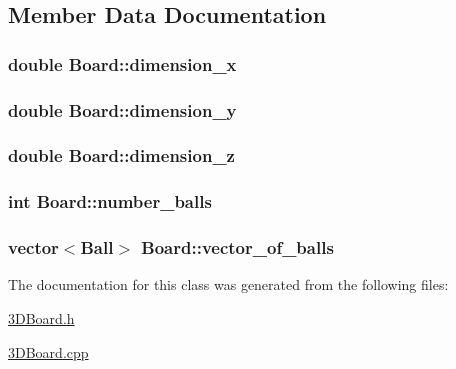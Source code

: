 \subsection{Member Data Documentation}
\hypertarget{classBoard_a0999b31427ac9b9cf2444bc73d2a4c79}{
\subsubsection[{dimension\+\_\+x}]{\setlength{\rightskip}{0pt plus 5cm}double Board\+::dimension\+\_\+x\hspace{0.3cm}{\ttfamily [private]}}}\label{classBoard_a0999b31427ac9b9cf2444bc73d2a4c79}
\hypertarget{classBoard_a7133e5c99e2ed0b9ec6d28c8ec8d783d}{
\subsubsection[{dimension\+\_\+y}]{\setlength{\rightskip}{0pt plus 5cm}double Board\+::dimension\+\_\+y\hspace{0.3cm}{\ttfamily [private]}}}\label{classBoard_a7133e5c99e2ed0b9ec6d28c8ec8d783d}
\hypertarget{classBoard_a8c3d794fe499598e755c9e2e35fb42ca}{
\subsubsection[{dimension\+\_\+z}]{\setlength{\rightskip}{0pt plus 5cm}double Board\+::dimension\+\_\+z\hspace{0.3cm}{\ttfamily [private]}}}\label{classBoard_a8c3d794fe499598e755c9e2e35fb42ca}
\hypertarget{classBoard_a3f5f80a78c7925c8e33d8e08d4799b9d}{
\subsubsection[{number\+\_\+balls}]{\setlength{\rightskip}{0pt plus 5cm}int Board\+::number\+\_\+balls\hspace{0.3cm}{\ttfamily [private]}}}\label{classBoard_a3f5f80a78c7925c8e33d8e08d4799b9d}
\hypertarget{classBoard_a2f3f6dcb96ea6cd77d7c6b3305f8a5d3}{
\subsubsection[{vector\+\_\+of\+\_\+balls}]{\setlength{\rightskip}{0pt plus 5cm}vector$<${\bf Ball}$>$ Board\+::vector\+\_\+of\+\_\+balls\hspace{0.3cm}{\ttfamily [private]}}}\label{classBoard_a2f3f6dcb96ea6cd77d7c6b3305f8a5d3}


The documentation for this class was generated from the following files\+:\begin{DoxyCompactItemize}
\item 
\hyperlink{3DBoard_8h}{3\+D\+Board.\+h}\item 
\hyperlink{3DBoard_8cpp}{3\+D\+Board.\+cpp}\end{DoxyCompactItemize}
